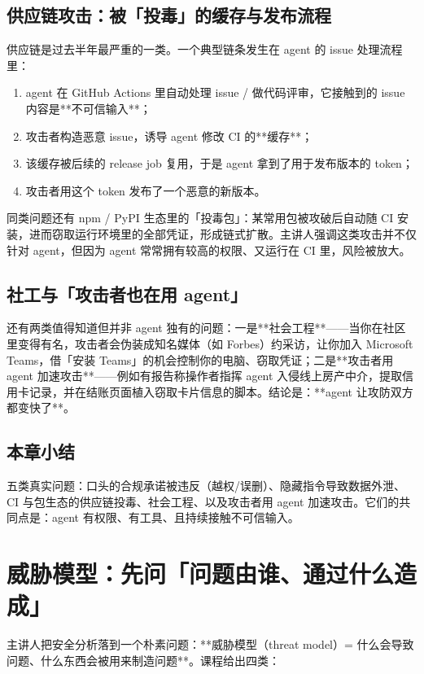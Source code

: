 ﻿\documentclass[a4paper]{article}
\begin{document}
\subsection{供应链攻击：被「投毒」的缓存与发布流程}

供应链是过去半年最严重的一类。一个典型链条发生在 agent 的 issue 处理流程里：

\begin{enumerate}
\item agent 在 GitHub Actions 里自动处理 issue / 做代码评审，它接触到的 issue 内容是**不可信输入**；
\item 攻击者构造恶意 issue，诱导 agent 修改 CI 的**缓存**；
\item 该缓存被后续的 release job 复用，于是 agent 拿到了用于发布版本的 token；
\item 攻击者用这个 token 发布了一个恶意的新版本。
\end{enumerate}

同类问题还有 npm / PyPI 生态里的「投毒包」：某常用包被攻破后自动随 CI 安装，进而窃取运行环境里的全部凭证，形成链式扩散。主讲人强调这类攻击并不仅针对 agent，但因为 agent 常常拥有较高的权限、又运行在 CI 里，风险被放大。

\subsection{社工与「攻击者也在用 agent」}

还有两类值得知道但并非 agent 独有的问题：一是**社会工程**——当你在社区里变得有名，攻击者会伪装成知名媒体（如 Forbes）约采访，让你加入 Microsoft Teams，借「安装 Teams」的机会控制你的电脑、窃取凭证；二是**攻击者用 agent 加速攻击**——例如有报告称操作者指挥 agent 入侵线上房产中介，提取信用卡记录，并在结账页面植入窃取卡片信息的脚本。结论是：**agent 让攻防双方都变快了**。

\subsection{本章小结}
五类真实问题：口头的合规承诺被违反（越权/误删）、隐藏指令导致数据外泄、CI 与包生态的供应链投毒、社会工程、以及攻击者用 agent 加速攻击。它们的共同点是：agent 有权限、有工具、且持续接触不可信输入。

\section{威胁模型：先问「问题由谁、通过什么造成」}

主讲人把安全分析落到一个朴素问题：**威胁模型（threat model）= 什么会导致问题、什么东西会被用来制造问题**。课程给出四类：
\end{document}
